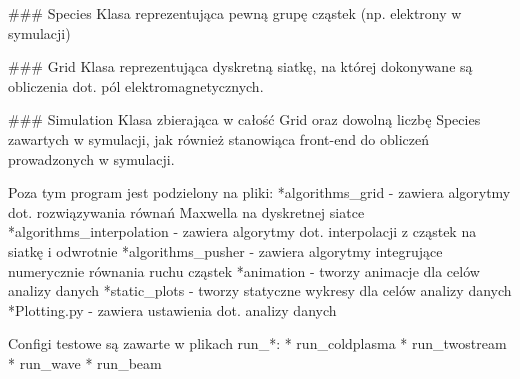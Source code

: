 ### Species
Klasa reprezentująca pewną grupę cząstek (np. elektrony w symulacji)

### Grid
Klasa reprezentująca dyskretną siatkę, na której dokonywane są obliczenia dot. pól elektromagnetycznych.

### Simulation
Klasa zbierająca w całość Grid oraz dowolną liczbę Species zawartych w symulacji, jak również
stanowiąca front-end %
do obliczeń prowadzonych w symulacji.

Poza tym program jest podzielony na pliki:
*algorithms_grid - zawiera algorytmy dot. rozwiązywania równań Maxwella na dyskretnej siatce
*algorithms_interpolation - zawiera algorytmy dot. interpolacji z cząstek na siatkę i odwrotnie
*algorithms_pusher - zawiera algorytmy integrujące numerycznie równania ruchu cząstek
*animation - tworzy animacje dla celów analizy danych
*static_plots - tworzy statyczne wykresy dla celów analizy danych
*Plotting.py - zawiera ustawienia dot. analizy danych %

Configi testowe są zawarte w plikach run_*: %
* run_coldplasma
* run_twostream
* run_wave
* run_beam

